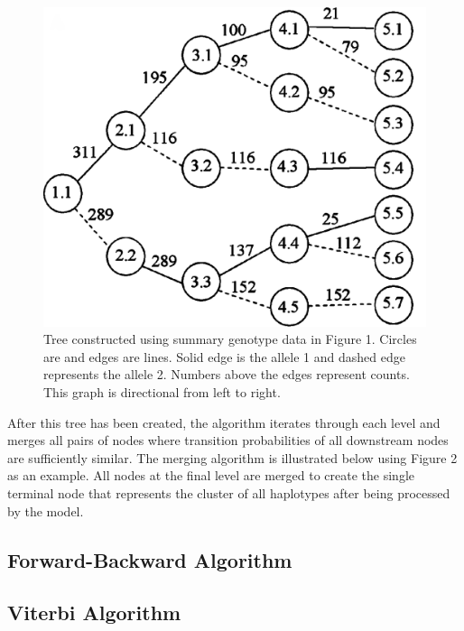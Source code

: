 \documentclass[a4paper,12pt,twoside,abstraction,titlepage]{article}
\begin{document}
\begin{figure}[ht]
\vspace{-10pt}
\begin{center}
\centerline{\includegraphics[scale=0.08]{fig3}}
\caption{Tree constructed using summary genotype data in Figure 1. Circles are and edges are lines. Solid edge is the allele 1 and dashed edge represents the allele 2. Numbers above the edges represent counts.  This graph is directional from left to right. \cite{beagle1}}

\end{center}
\vspace{-25pt}
\end{figure}




After this tree has been created, the algorithm iterates through each level and merges all pairs of nodes where transition probabilities of all downstream nodes are sufficiently similar.  The merging algorithm is illustrated below using Figure 2 as an example.  All nodes at the final level are merged to create the single terminal node that represents the cluster of all haplotypes after being processed by the model.

\newpage
\subsection{Forward-Backward Algorithm}

\subsection{Viterbi Algorithm}
\end{document}

